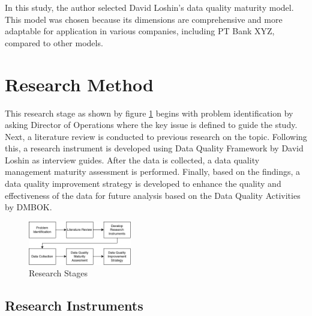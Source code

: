 \documentclass[conference]{IEEEtran}
\begin{document}


In this study, the author selected David Loshin's data quality maturity model. This model was chosen because its dimensions are comprehensive and more adaptable for application in various companies, including PT Bank XYZ, compared to other models.

\section{Research Method}

This research stage as shown by figure \ref{fig:research-step} begins with problem identification by asking Director of Operations where the key issue is defined to guide the study. Next, a literature review is conducted to previous research on the topic. Following this, a research instrument is developed using Data Quality Framework by David Loshin \cite{loshin_dqi} as interview guides. After the data is collected, a data quality management maturity assessment is performed. Finally, based on the findings, a data quality improvement strategy is developed to enhance the quality and effectiveness of the data for future analysis based on the Data Quality Activities by DMBOK.
\begin{figure}[H]
\centerline{\includegraphics[width=0.4\textwidth]{figures/AlurPenelitian.png}}
\caption{Research Stages}
\label{fig:research-step}
\end{figure}

\subsection{Research Instruments}
\end{document}
